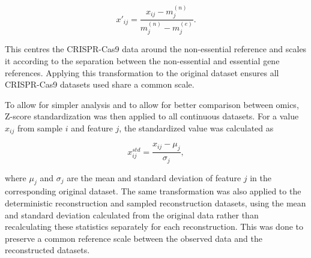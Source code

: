 \begin{equation}
   x'_{ij} = \frac{x_{ij} - m^{(n)}_j}{m^{(n)}_j - m^{(e)}_j}.
\end{equation}

This centres the CRISPR-Cas9 data around the non-essential reference and scales it according to the separation between the non-essential and essential gene references. Applying this transformation to the original dataset ensures all CRISPR-Cas9 datasets used share a common scale.

To allow for simpler analysis and to allow for better comparison between omics, Z-score standardization was then applied to all continuous datasets. For a value $x_{ij}$ from sample $i$ and feature $j$, the standardized value was calculated as

\begin{equation}
   x_{ij}^{std} = \frac{x_{ij} - \mu_j}{\sigma_j},
\end{equation}

where $\mu_j$ and $\sigma_j$ are the mean and standard deviation of feature $j$ in the corresponding original dataset. The same transformation was also applied to the deterministic reconstruction and sampled reconstruction datasets, using the mean and standard deviation calculated from the original data rather than recalculating these statistics separately for each reconstruction. This was done to preserve a common reference scale between the observed data and the reconstructed datasets.